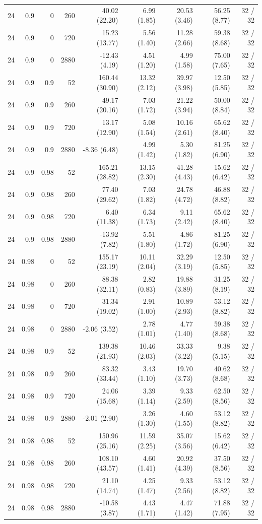 \begin{longtable}{rrrrrrrrr}
24 & 0.9 & 0 & 260 & 40.02 (22.20) & 6.99 (1.85) & 20.53 (3.46) & 56.25 (8.77) & 32 / 32\\
24 & 0.9 & 0 & 720 & 15.23 (13.77) & 5.56 (1.40) & 11.28 (2.66) & 59.38 (8.68) & 32 / 32\\
24 & 0.9 & 0 & 2880 & -12.43 (4.19) & 4.51 (1.20) & 4.99 (1.58) & 75.00 (7.65) & 32 / 32\\
24 & 0.9 & 0.9 & 52 & 160.44 (30.90) & 13.32 (2.12) & 39.97 (3.98) & 12.50 (5.85) & 32 / 32\\
24 & 0.9 & 0.9 & 260 & 49.17 (20.16) & 7.03 (1.72) & 21.22 (3.94) & 50.00 (8.84) & 32 / 32\\
24 & 0.9 & 0.9 & 720 & 13.17 (12.90) & 5.08 (1.54) & 10.16 (2.61) & 65.62 (8.40) & 32 / 32\\
24 & 0.9 & 0.9 & 2880 & -8.36 (6.48) & 4.99 (1.42) & 5.30 (1.82) & 81.25 (6.90) & 32 / 32\\
24 & 0.9 & 0.98 & 52 & 165.21 (28.82) & 13.15 (2.30) & 41.28 (4.43) & 15.62 (6.42) & 32 / 32\\
24 & 0.9 & 0.98 & 260 & 77.40 (29.62) & 7.03 (1.82) & 24.78 (4.72) & 46.88 (8.82) & 32 / 32\\
24 & 0.9 & 0.98 & 720 & 6.40 (11.38) & 6.34 (1.73) & 9.11 (2.42) & 65.62 (8.40) & 32 / 32\\
24 & 0.9 & 0.98 & 2880 & -13.92 (7.82) & 5.51 (1.80) & 4.86 (1.72) & 81.25 (6.90) & 32 / 32\\
24 & 0.98 & 0 & 52 & 155.17 (23.19) & 10.11 (2.04) & 32.29 (3.19) & 12.50 (5.85) & 32 / 32\\
24 & 0.98 & 0 & 260 & 88.38 (32.11) & 2.82 (0.83) & 19.88 (3.89) & 31.25 (8.19) & 32 / 32\\
24 & 0.98 & 0 & 720 & 31.34 (19.02) & 2.91 (1.00) & 10.89 (2.93) & 53.12 (8.82) & 32 / 32\\
24 & 0.98 & 0 & 2880 & -2.06 (3.52) & 2.78 (1.01) & 4.77 (1.40) & 59.38 (8.68) & 32 / 32\\
24 & 0.98 & 0.9 & 52 & 139.38 (21.93) & 10.46 (2.03) & 33.33 (3.22) & 9.38 (5.15) & 32 / 32\\
24 & 0.98 & 0.9 & 260 & 83.32 (33.44) & 3.43 (1.10) & 19.70 (3.73) & 40.62 (8.68) & 32 / 32\\
24 & 0.98 & 0.9 & 720 & 24.06 (15.68) & 3.39 (1.14) & 9.33 (2.59) & 62.50 (8.56) & 32 / 32\\
24 & 0.98 & 0.9 & 2880 & -2.01 (2.90) & 3.26 (1.30) & 4.60 (1.55) & 53.12 (8.82) & 32 / 32\\
24 & 0.98 & 0.98 & 52 & 150.96 (25.16) & 11.59 (2.25) & 35.07 (3.56) & 15.62 (6.42) & 32 / 32\\
24 & 0.98 & 0.98 & 260 & 108.10 (43.57) & 4.60 (1.41) & 20.92 (4.39) & 37.50 (8.56) & 32 / 32\\
24 & 0.98 & 0.98 & 720 & 21.10 (14.74) & 4.25 (1.47) & 9.33 (2.56) & 53.12 (8.82) & 32 / 32\\
24 & 0.98 & 0.98 & 2880 & -10.58 (3.87) & 4.43 (1.71) & 4.47 (1.42) & 71.88 (7.95) & 32 / 32\\
\end{longtable}
\endgroup
